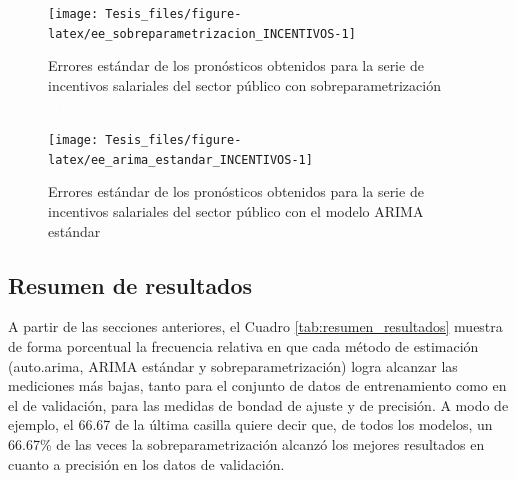 \documentclass[
]{article}
\begin{document}
\begin{figure}[H]
\texttt{[image: Tesis\_files/figure-latex/ee\_sobreparametrizacion\_INCENTIVOS-1]} \caption{Errores estándar de los pronósticos obtenidos para la serie de incentivos salariales del sector público con sobreparametrización \textcolor{white}{prueba de aaaaaaaaaaaaaaaaaaaaaaa}}\label{fig:ee_sobreparametrizacion_INCENTIVOS}
\end{figure}

\begin{figure}[H]
\texttt{[image: Tesis\_files/figure-latex/ee\_arima\_estandar\_INCENTIVOS-1]} \caption{Errores estándar de los pronósticos obtenidos para la serie de incentivos salariales del sector público con el modelo ARIMA estándar \textcolor{white}{prueba de aaaaaaaaaaaaaaaaaaaaaaa}}\label{fig:ee_arima_estandar_INCENTIVOS}
\end{figure}

\subsection{Resumen de resultados}

A partir de las secciones anteriores, el Cuadro
\ref{tab:resumen_resultados} muestra de forma porcentual la frecuencia
relativa en que cada método de estimación (auto.arima, ARIMA estándar y
sobreparametrización) logra alcanzar las mediciones más bajas, tanto
para el conjunto de datos de entrenamiento como en el de validación,
para las medidas de bondad de ajuste y de precisión. A modo de ejemplo,
el 66.67 de la última casilla quiere decir que, de todos los modelos, un
66.67\% de las veces la sobreparametrización alcanzó los mejores
resultados en cuanto a precisión en los datos de validación.

\begin{table}[H]

\caption{\label{tab:unnamed-chunk-38}\label{tab:resumen_resultados}Distribución porcentual de los métodos de estimación que alcanzaron los mejores resultados según conjunto de datos y tipo de medición}
\centering
{}
\end{table}
\end{document}
